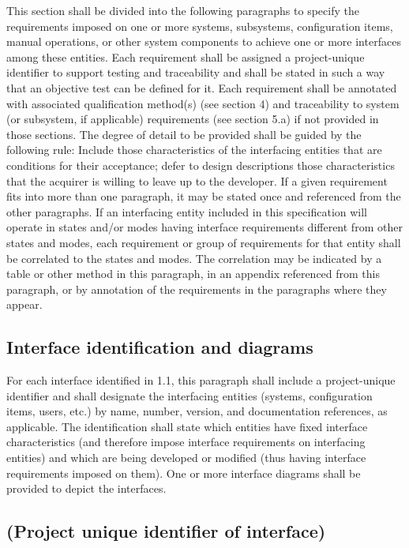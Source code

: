 \documentclass{fidata-report-template}
\begin{document}
This section shall be divided into the following paragraphs to specify
the requirements imposed on one or more systems, subsystems,
configuration items, manual operations, or other system components to
achieve one or more interfaces among these entities. Each requirement
shall be assigned a project-unique identifier to support testing and
traceability and shall be stated in such a way that an objective test
can be defined for it. Each requirement shall be annotated with
associated qualification method(s) (see section 4) and traceability to
system (or subsystem, if applicable) requirements (see section 5.a) if
not provided in those sections. The degree of detail to be provided
shall be guided by the following rule: Include those characteristics of
the interfacing entities that are conditions for their acceptance; defer
to design descriptions those characteristics that the acquirer is
willing to leave up to the developer. If a given requirement fits into
more than one paragraph, it may be stated once and referenced from the
other paragraphs. If an interfacing entity included in this
specification will operate in states and/or modes having interface
requirements different from other states and modes, each requirement or
group of requirements for that entity shall be correlated to the states
and modes. The correlation may be indicated by a table or other method
in this paragraph, in an appendix referenced from this paragraph, or by
annotation of the requirements in the paragraphs where they appear.

\subsection{Interface identification and diagrams}

For each interface identified in 1.1, this paragraph shall include a
project-unique identifier and shall designate the interfacing entities
(systems, configuration items, users, etc.) by name, number, version,
and documentation references, as applicable. The identification shall
state which entities have fixed interface characteristics (and therefore
impose interface requirements on interfacing entities) and which are
being developed or modified (thus having interface requirements imposed
on them). One or more interface diagrams shall be provided to depict the
interfaces.

\subsection{(Project unique identifier of interface)}
\end{document}
